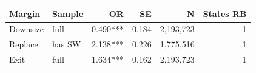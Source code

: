 \begin{tabular}{llrrrr}
\toprule
Margin & Sample & OR & SE & N & States RB \\
\midrule
Downsize & full & 0.490*** & 0.184 & 2,193,723 & 1 \\
Replace & has SW & 2.138*** & 0.226 & 1,775,516 & 1 \\
Exit & full & 1.634*** & 0.162 & 2,193,723 & 1 \\
\bottomrule
\end{tabular}

